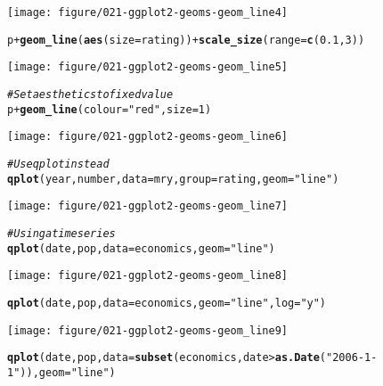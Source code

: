\documentclass[a4paper,titlepage]{tufte-handout}\usepackage[]{graphicx}\usepackage[]{color}
\makeatletter
\def\maxwidth{ %
  \ifdim\Gin@nat@width>\linewidth
    \linewidth
  \else
    \Gin@nat@width
  \fi
}
\newcommand{\hlnum}[1]{\textcolor[rgb]{0.686,0.059,0.569}{#1}}%
\newcommand{\hlstr}[1]{\textcolor[rgb]{0.192,0.494,0.8}{#1}}%
\newcommand{\hlcom}[1]{\textcolor[rgb]{0.678,0.584,0.686}{\textit{#1}}}%
\newcommand{\hlopt}[1]{\textcolor[rgb]{0,0,0}{#1}}%
\newcommand{\hlstd}[1]{\textcolor[rgb]{0.345,0.345,0.345}{#1}}%
\newcommand{\hlkwc}[1]{\textcolor[rgb]{0.333,0.667,0.333}{#1}}%
\newcommand{\hlkwd}[1]{\textcolor[rgb]{0.737,0.353,0.396}{\textbf{#1}}}%
\newenvironment{kframe}{%
 \def\at@end@of@kframe{}%
 \ifinner\ifhmode%
  \def\at@end@of@kframe{\end{minipage}}%
  \begin{minipage}{\columnwidth}%
 \fi\fi%
 \def\FrameCommand##1{\hskip\@totalleftmargin \hskip-\fboxsep
 \colorbox{shadecolor}{##1}\hskip-\fboxsep
     \hskip-\linewidth \hskip-\@totalleftmargin \hskip\columnwidth}%
 \MakeFramed {\advance\hsize-\width
   \@totalleftmargin\z@ \linewidth\hsize
   \@setminipage}}%
 {\par\unskip\endMakeFramed%
 \at@end@of@kframe}
\newenvironment{knitrout}{}{} %
\makeatother
\begin{document}
\begin{knitrout}
\texttt{[image: figure/021-ggplot2-geoms-geom\_line4]} 
\begin{kframe}\begin{alltt}
\hlstd{p} \hlopt{+} \hlkwd{geom_line}\hlstd{(}\hlkwd{aes}\hlstd{(}\hlkwc{size} \hlstd{= rating))} \hlopt{+} \hlkwd{scale_size}\hlstd{(}\hlkwc{range} \hlstd{=} \hlkwd{c}\hlstd{(}\hlnum{0.1}\hlstd{,} \hlnum{3}\hlstd{))}
\end{alltt}
\end{kframe}
\texttt{[image: figure/021-ggplot2-geoms-geom\_line5]} 
\begin{kframe}\begin{alltt}
\hlcom{# Set aesthetics to fixed value}
\hlstd{p} \hlopt{+} \hlkwd{geom_line}\hlstd{(}\hlkwc{colour} \hlstd{=} \hlstr{"red"}\hlstd{,} \hlkwc{size} \hlstd{=} \hlnum{1}\hlstd{)}
\end{alltt}
\end{kframe}
\texttt{[image: figure/021-ggplot2-geoms-geom\_line6]} 
\begin{kframe}\begin{alltt}
\hlcom{# Use qplot instead}
\hlkwd{qplot}\hlstd{(year, number,} \hlkwc{data}\hlstd{=mry,} \hlkwc{group}\hlstd{=rating,} \hlkwc{geom}\hlstd{=}\hlstr{"line"}\hlstd{)}
\end{alltt}
\end{kframe}
\texttt{[image: figure/021-ggplot2-geoms-geom\_line7]} 
\begin{kframe}\begin{alltt}
\hlcom{# Using a time series}
\hlkwd{qplot}\hlstd{(date, pop,} \hlkwc{data}\hlstd{=economics,} \hlkwc{geom}\hlstd{=}\hlstr{"line"}\hlstd{)}
\end{alltt}
\end{kframe}
\texttt{[image: figure/021-ggplot2-geoms-geom\_line8]} 
\begin{kframe}\begin{alltt}
\hlkwd{qplot}\hlstd{(date, pop,} \hlkwc{data}\hlstd{=economics,} \hlkwc{geom}\hlstd{=}\hlstr{"line"}\hlstd{,} \hlkwc{log}\hlstd{=}\hlstr{"y"}\hlstd{)}
\end{alltt}
\end{kframe}
\texttt{[image: figure/021-ggplot2-geoms-geom\_line9]} 
\begin{kframe}\begin{alltt}
\hlkwd{qplot}\hlstd{(date, pop,} \hlkwc{data}\hlstd{=}\hlkwd{subset}\hlstd{(economics, date} \hlopt{>} \hlkwd{as.Date}\hlstd{(}\hlstr{"2006-1-1"}\hlstd{)),} \hlkwc{geom}\hlstd{=}\hlstr{"line"}\hlstd{)}

\end{alltt}
\end{kframe}
\end{knitrout}
\end{document}
